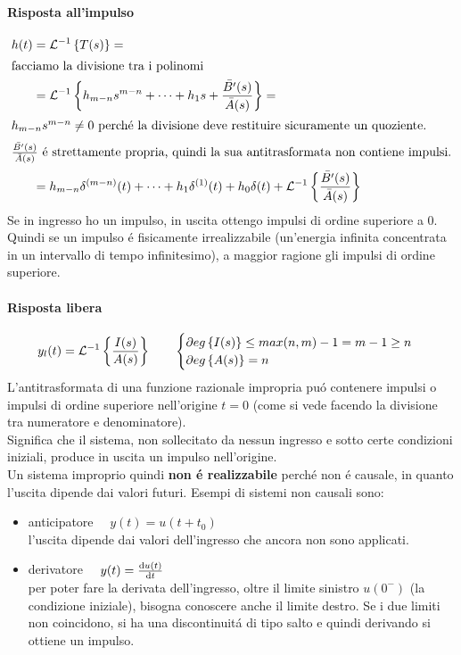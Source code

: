 \documentclass[../main.tex]{subfiles}
\begin{document}
	\paragraph{Risposta all'impulso}
	\begin{align*}
	h(t) &= \mathcal{L}^{-1} \left\lbrace T(s) \right\rbrace =\\
	\intertext{facciamo la divisione tra i polinomi}
	&= \mathcal{L}^{-1} \left\lbrace h_{m-n}s^{m-n} + \dots + h_1s + \frac{\bar{B'}(s)}{\bar{A}(s)} \right\rbrace =\\
	\intertext{$ h_{m-n}s^{m-n} \neq 0 $ perch\'{e} la divisione deve restituire sicuramente un quoziente.}
	\intertext{$ \frac{\bar{B'}(s)}{\bar{A}(s)} $ \'{e} strettamente propria, quindi la sua antitrasformata non contiene impulsi.}
	&= h_{m-n} \delta^{(m-n)}(t) + \dots + h_1 \delta^{(1)}(t) + h_0 \delta(t) + \mathcal{L}^{-1} \left\lbrace \frac{\bar{B'}(s)}{\bar{A}(s)} \right\rbrace
	\end{align*}
	Se in ingresso ho un impulso, in uscita ottengo impulsi di ordine superiore a 0. Quindi se un impulso \'{e} fisicamente irrealizzabile (un'energia infinita concentrata in un intervallo di tempo infinitesimo), a maggior ragione gli impulsi di ordine superiore.
	\paragraph{Risposta libera}
	\[ y_l(t) = \mathcal{L}^{-1} \left\lbrace \frac{I(s)}{A(s)} \right\rbrace \qquad \begin{cases} \partial eg \left\lbrace I(s) \right\rbrace \leq max(n,m)-1 = m-1 \geq n\\ \partial eg \left\lbrace A(s) \right\rbrace = n \end{cases}\]
	L'antitrasformata di una funzione razionale impropria pu\'{o} contenere impulsi o impulsi di ordine superiore nell'origine $ t = 0 $ (come si vede facendo la divisione tra numeratore e denominatore).\\
	Significa che il sistema, non sollecitato da nessun ingresso e sotto certe condizioni iniziali, produce in uscita un impulso nell'origine.\\
	Un sistema improprio quindi \textbf{non \'{e} realizzabile} perch\'{e} non \'{e} causale, in quanto l'uscita dipende dai valori futuri.
	Esempi di sistemi non causali sono:
	\begin{itemize}
		\item anticipatore $\quad y(t) = u(t+t_0) $\\
		l'uscita dipende dai valori dell'ingresso che ancora non sono applicati.
		\item derivatore $\quad y(t) = \frac{\mathrm{d} u(t)}{\mathrm{d} t} $\\
		per poter fare la derivata dell'ingresso, oltre il limite sinistro $ u(0^-) $ (la condizione iniziale), bisogna conoscere anche il limite destro. Se i due limiti non coincidono, si ha una discontinuit\'{a} di tipo salto e quindi derivando si ottiene un impulso.
	\end{itemize}
\end{document}
